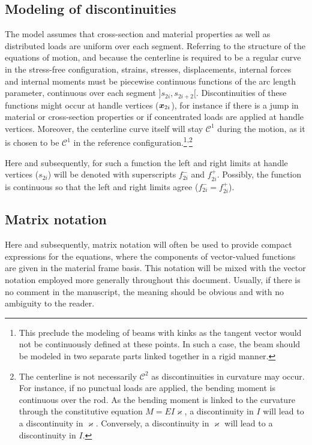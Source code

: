  \subsection{Modeling of discontinuities}
The model assumes that cross-section and material properties as well as distributed loads are uniform over each segment. Referring to the structure of the equations of motion, and because the centerline is required to be a regular curve in the stress-free configuration, strains, stresses, displacements, internal forces and internal moments must be piecewise continuous functions of the arc length parameter, continuous over each segment $]s_{2i},s_{2i+2}[$. Discontinuities of these functions might occur at handle vertices ($\boldsymbol{x}_{2i}$), for instance if there is a jump in material or cross-section properties or if concentrated loads are applied at handle vertices. Moreover, the centerline curve itself will stay $\mathcal{C}^1$ during the motion, as it is chosen to be $\mathcal{C}^1$ in the reference configuration.\footnote{This preclude the modeling of beams with kinks as the tangent vector would not be continuously defined at these points. In such a case, the beam should be modeled in two separate parts linked together in a rigid manner.}\textsuperscript{,}\footnote{The centerline is not necessarily $\mathcal{C}^2$ as discontinuities in curvature may occur. For instance, if no punctual loads are applied, the bending moment is continuous over the rod. As the bending moment is linked to the curvature through the constitutive equation $M = EI\varkappa$, a discontinuity in $I$ will lead to a discontinuity in $\varkappa$. Conversely, a discontinuity in $\varkappa$ will lead to a discontinuity in $I$.}

Here and subsequently, for such a function the left and right limits at handle vertices ($s_{2i}$) will be denoted with superscripts $f_{2i}^-$ and $f_{2i}^+$. Possibly, the function is continuous so that the left and right limits agree ($f_{2i}^- = f_{2i}^+$).

\subsection{Matrix notation}
Here and subsequently, matrix notation will often be used to provide compact expressions for the equations, where the components of vector-valued functions are given in the material frame basis. This notation will be mixed with the vector notation employed  more generally throughout this document. Usually, if there is no comment in the manuscript, the meaning should be obvious and with no ambiguity to the reader.

